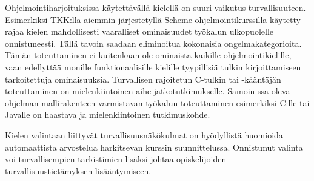 Ohjelmointiharjoituksissa käytettävällä kielellä on suuri vaikutus
turvallisuuteen. Esimerkiksi TKK:lla aiemmin järjestetyllä Scheme-ohjelmointikurssilla
käytetty {\scmrobo} rajaa kielen mahdollisesti vaaralliset ominaisuudet
työkalun ulkopuolelle onnistuneesti. Tällä tavoin saadaan eliminoitua
kokonaisia ongelmakategorioita. Tämän toteuttaminen ei kuitenkaan
ole ominaista kaikille ohjelmointikielille, vaan edellyttää monille
funktionaalisille kielille tyypillisiä tulkin kirjoittamiseen tarkoitettuja
ominaisuuksia. Turvallisen rajoitetun C-tulkin tai -kääntäjän toteuttaminen
on mielenkiintoinen aihe jatkotutkimukselle. Samoin \scmrobo ssa oleva
ohjelman mallirakenteen varmistavan työkalun toteuttaminen esimerkiksi C:lle
tai Javalle on haastava ja mielenkiintoinen tutkimuskohde.

Kielen valintaan liittyvät turvallisuusnäkökulmat on hyödyllistä
huomioida automaattista arvostelua harkitsevan kurssin suunnittelussa.
Onnistunut valinta voi turvallisempien tarkistimien lisäksi johtaa
opiskelijoiden turvallisuustietämyksen lisääntymiseen.

\pagebreak
